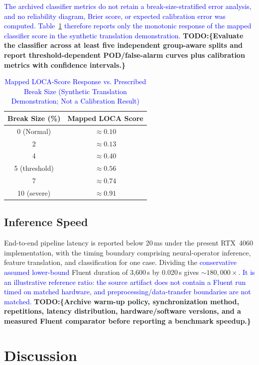 \documentclass[journal]{IEEEtran}
\newcommand{\added}[1]{\textcolor{blue}{#1}}
\newcommand{\todo}[1]{\textcolor{green!50!black}{\textbf{TODO:\{#1\}}}}
\begin{document}
 \added{The archived classifier metrics do not retain a break-size-stratified error analysis, and no reliability diagram, Brier score, or expected calibration error was computed. Table~\ref{tab:probability} therefore reports only the monotonic response of the mapped classifier score in the synthetic translation demonstration.} \todo{Evaluate the classifier across at least five independent group-aware splits and report threshold-dependent POD/false-alarm curves plus calibration metrics with confidence intervals.}

\begin{table}[htbp]
\caption{\added{Mapped LOCA-Score Response vs. Prescribed Break Size (Synthetic Translation Demonstration; Not a Calibration Result)}}
\label{tab:probability}
\centering
\begin{tabular}{cc}
\toprule
\textbf{Break Size (\%)} & \textbf{Mapped LOCA Score} \\
\midrule
0 (Normal) & $\approx 0.10$ \\
2 & $\approx 0.13$ \\
4 & $\approx 0.40$ \\
5 (threshold) & $\approx 0.56$ \\
7 & $\approx 0.74$ \\
10 (severe) & $\approx 0.91$ \\
\bottomrule
\end{tabular}
\end{table}

\subsection{Inference Speed}

End-to-end pipeline latency is reported below 20\,ms under the present RTX~4060 implementation, with the timing boundary comprising neural-operator inference, feature translation, and classification for one case. Dividing the \added{conservative assumed lower-bound} Fluent duration of 3,600\,s by 0.020\,s gives \textbf{${\sim}180{,}000\times$}.  \added{It is an illustrative reference ratio: the source artifact does not contain a Fluent run timed on matched hardware, and preprocessing/data-transfer boundaries are not matched.} \todo{Archive warm-up policy, synchronization method, repetitions, latency distribution, hardware/software versions, and a measured Fluent comparator before reporting a benchmark speedup.}

\section{Discussion}
\label{sec:discussion}
\end{document}
